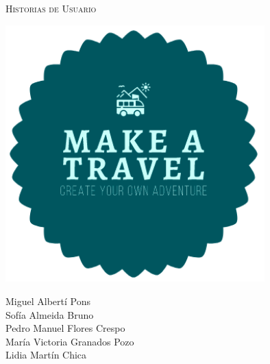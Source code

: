 \documentclass[11pt]{article}
\begin{document}
\begin{titlepage}
\centering
\vspace{4.5cm}
{\scshape\LARGE Historias de Usuario \par}
\vspace{1.5cm}

\includegraphics[width=10cm]{Logo}

\vspace{3cm}
{\scshape\large \par}
\vspace{1cm}

{Miguel Albertí Pons\\
Sofía Almeida Bruno\\
Pedro Manuel Flores Crespo\\
María Victoria Granados Pozo\\
Lidia Martín Chica
\par}

\end{titlepage}
\newpage
\end{document}
